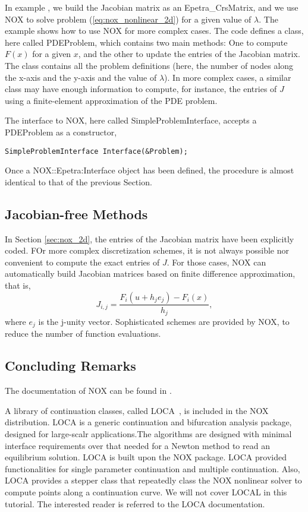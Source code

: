 In example , we build the Jacobian matrix as an
Epetra\_CrsMatrix, and we use NOX to solve problem
(\ref{eq:nox_nonlinear_2d}) for a given value of $\lambda$.  The example
shows how to use NOX for more complex cases. The code defines a class,
here called PDEProblem, which contains two main methods: One to compute
$F(x)$ for a given $x$, and the other to update the entries of the
Jacobian matrix. The class contains all the problem definitions (here,
the number of nodes along the x-axis and the y-axis and the value of
$\lambda$). In more complex cases, a similar class may have enough
information to compute, for instance, the entries of $J$ using a
finite-element approximation of the PDE problem.

The interface to NOX, here called SimpleProblemInterface, accepts a
PDEProblem as a constructor,
\begin{verbatim}
SimpleProblemInterface Interface(&Problem);
\end{verbatim}
Once a NOX::Epetra:Interface object has been defined, the procedure is
almost identical to that of the previous Section.


\subsection{Jacobian-free Methods}
\label{sec:nox_jacobian_free}

In Section \ref{sec:nox_2d}, the entries of the Jacobian matrix have
been explicitly coded. FOr more complex discretization schemes, it is
not always possible nor convenient to compute the exact entries of
$J$. For those cases, NOX can automatically build Jacobian matrices
based on finite difference approximation, that is,
\[
J_{i,j} = \frac{F_i(u + h_j e_j) - F_i(x)}{h_j} ,
\] 
where $e_j$ is the j-unity vector. Sophisticated schemes are provided by
NOX, to reduce the number of function evaluations.


\subsection{Concluding Remarks}
\label{sec:local}

The documentation of NOX can be found in \cite{NOX-home-page}.

A library of continuation classes, called
LOCA~\cite{LOCA-manual,LOCA-MPSalsa-paper}, is included in the NOX
distribution. LOCA is a generic continuation and bifurcation analysis
package, designed for large-scalr applications.The algorithms are
designed with minimal interface requirements over that needed for a
Newton method to read an equilibrium solution. LOCA is built upon the
NOX package. LOCA provided functionalities for single parameter
continuation and multiple continuation. Also, LOCA provides a stepper
class that repeatedly class the NOX nonlinear solver to compute points
along a continuation curve. We will not cover LOCAL in this tutorial.
The interested reader is referred to the LOCA documentation.

